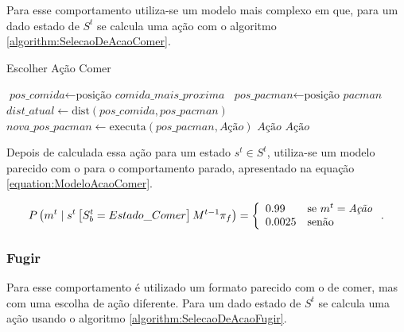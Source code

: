 Para esse comportamento utiliza-se um modelo mais complexo em que, para um dado estado de $ S^t $ se calcula uma ação com o algoritmo \ref{algorithm:SelecaoDeAcaoComer}.

\begin{algorithm}[H]
	\caption{Escolher Ação Comer} \label{algorithm:SelecaoDeAcaoComer}
	\begin{algorithmic}[1]
			\State $\textit{pos\_comida} \gets \text{posição }\textit{comida\_mais\_proxima} $
			\State $\textit{pos\_pacman} \gets \text{posição }\textit{pacman} $
			\State $\textit{dist\_atual} \gets \text{dist} \left( \textit{pos\_comida}, \textit{pos\_pacman} \right) $
				\State $\textit{nova\_pos\_pacman} \gets \text{executa} \left( \textit{pos\_pacman}, \textit{Ação} \right) $
					\State \Return $ \textit{Ação} $
				\EndIf 
			\EndFor
			\State \Return $ \textit{Ação} $
		\EndProcedure
	\end{algorithmic}
\end{algorithm}

Depois de calculada essa ação para um estado $ s^t \in S^t $, utiliza-se um modelo parecido com o para o comportamento parado, apresentado na equação \ref{equation:ModeloAcaoComer}.

\begin{equation} \label{equation:ModeloAcaoComer}
    P \left( m^t \mid s^t \left[ S_b^t = Estado\_Comer \right] M^{t-1} \pi_f \right) = 
        \left\{
            \begin{array}{l l}
                0.99 & \text{se }m^t = \textit{Ação} \\
                0.0025 & \text{senão}
            \end{array}
        \right..
\end{equation}

\subsubsection*{Fugir}

Para esse comportamento é utilizado um formato parecido com o de comer, mas com uma escolha de ação diferente. Para um dado estado de $ S^t $ se calcula uma ação usando o algoritmo \ref{algorithm:SelecaoDeAcaoFugir}.


